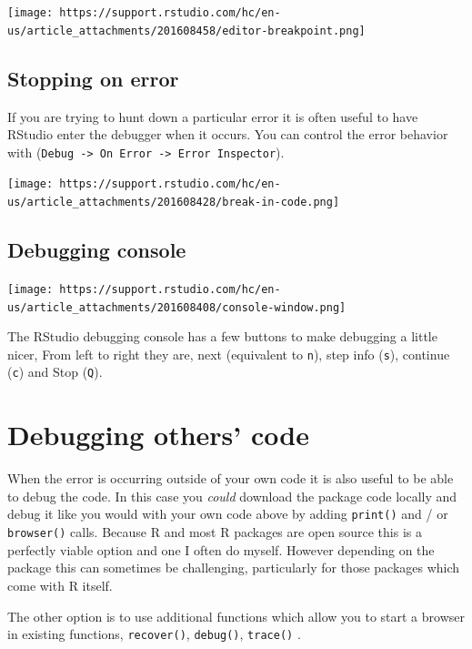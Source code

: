 \documentclass[
  letterpaper,
]{book}
\begin{document}
\texttt{[image: https://support.rstudio.com/hc/en-us/article\_attachments/201608458/editor-breakpoint.png]}

\hypertarget{stopping-on-error}{%
\subsection*{Stopping on error}\label{stopping-on-error}}

If you are trying to hunt down a particular error it is often useful to
have RStudio enter the debugger when it occurs. You can control the
error behavior with
(\texttt{Debug\ -\textgreater{}\ On\ Error\ -\textgreater{}\ Error\ Inspector}).

\texttt{[image: https://support.rstudio.com/hc/en-us/article\_attachments/201608428/break-in-code.png]}

\hypertarget{debugging-console}{%
\subsection*{Debugging console}\label{debugging-console}}

\texttt{[image: https://support.rstudio.com/hc/en-us/article\_attachments/201608408/console-window.png]}

The RStudio debugging console has a few buttons to make debugging a
little nicer, From left to right they are, next (equivalent to
\texttt{n}), step info (\texttt{s}), continue (\texttt{c}) and Stop
(\texttt{Q}).

\hypertarget{debugging-others-code}{%
\section*{Debugging others' code}\label{debugging-others-code}}

When the error is occurring outside of your own code it is also useful
to be able to debug the code. In this case you \emph{could} download the
package code locally and debug it like you would with your own code
above by adding \texttt{print()} and / or \texttt{browser()} calls.
Because R and most R packages are open source this is a perfectly viable
option and one I often do myself. However depending on the package this
can sometimes be challenging, particularly for those packages which come
with R itself.

The other option is to use additional functions which allow you to start
a browser in existing functions, \texttt{recover()}, \texttt{debug()},
\texttt{trace()} .
\end{document}
